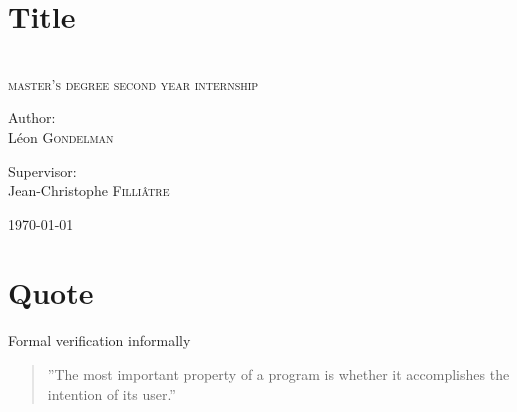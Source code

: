 \documentclass[xcolor=dvipsnames]{beamer}
\let\emph\alert
\newcommand{\HRule}{\rule{\linewidth}{0.1mm}}
\begin{document}
\section*{Title}
\begin{frame}
\begin{center}
\vspace{-1.cm}

\textsc{}\\
 \textsc{ \scriptsize master's degree second year internship}\\[2cm]
\bigskip
\begin{minipage}{0.3\textwidth}
\begin{flushleft} 
\emph{Author:}\\
L\'eon \textsc{Gondelman}
\end{flushleft}
\end{minipage}
\begin{minipage}{0.5\textwidth}
\begin{flushright} 
\emph{Supervisor:} \\
Jean-Christophe \textsc{Filli\^atre}
\end{flushright}
\end{minipage}

\vfill

{\small \today}



\end{center}
\end{frame}




\section*{Quote}
\begin{frame}{Formal verification informally}
\begin{quotation}
 ''The most important property of a program is whether it accomplishes the intention of its user.''\\
\hfill{}
\end{quotation}
\bigskip
\end{frame}
\end{document}
